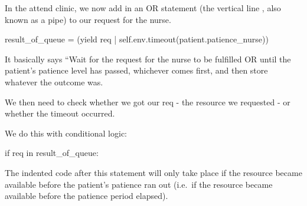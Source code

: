 \documentclass[
  letterpaper,
  DIV=11,
  numbers=noendperiod]{scrreprt}
\newenvironment{Shaded}{\begin{snugshade}}{\end{snugshade}}
\newcommand{\ControlFlowTok}[1]{\textcolor[rgb]{0.00,0.23,0.31}{#1}}
\newcommand{\KeywordTok}[1]{\textcolor[rgb]{0.00,0.23,0.31}{#1}}
\newcommand{\NormalTok}[1]{\textcolor[rgb]{0.00,0.23,0.31}{#1}}
\newcommand{\OperatorTok}[1]{\textcolor[rgb]{0.37,0.37,0.37}{#1}}
\newcommand{\VariableTok}[1]{\textcolor[rgb]{0.07,0.07,0.07}{#1}}
\begin{document}
In the attend clinic, we now add in an OR statement (the vertical line
\textbar{} , also known as a pipe) to our request for the nurse.

\begin{Shaded}
\begin{Highlighting}[]
\NormalTok{result\_of\_queue }\OperatorTok{=}\NormalTok{ (}\ControlFlowTok{yield}\NormalTok{ req }\OperatorTok{|} \VariableTok{self}\NormalTok{.env.timeout(patient.patience\_nurse))}
\end{Highlighting}
\end{Shaded}

It basically says ``Wait for the request for the nurse to be fulfilled
OR until the patient's patience level has passed, whichever comes first,
and then store whatever the outcome was.

We then need to check whether we got our req - the resource we requested
- or whether the timeout occurred.

We do this with conditional logic:

\begin{Shaded}
\begin{Highlighting}[]
\ControlFlowTok{if}\NormalTok{ req }\KeywordTok{in}\NormalTok{ result\_of\_queue:}
\end{Highlighting}
\end{Shaded}

The indented code after this statement will only take place if the
resource became available before the patient's patience ran out (i.e.~if
the resource became available before the patience period elapsed).
\end{document}
